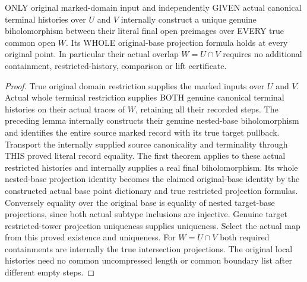 \begin{theorem}
\label{hir:original-independent-local-terminal-overlap-unique-comparison}
\leanok
ONLY original marked-domain input and independently GIVEN actual canonical
terminal histories over $U$ and $V$ internally construct a unique genuine
biholomorphism between their literal final open preimages over EVERY true
common open $W$. Its WHOLE original-base projection formula holds at every
original point. In particular their actual overlap $W=U\cap V$ requires
no additional containment, restricted-history, comparison or lift certificate.
\end{theorem}
\begin{proof}
True original domain restriction supplies the marked inputs over $U$ and
$V$. Actual whole terminal restriction supplies BOTH genuine canonical
terminal histories on their actual traces of $W$, retaining all their
recorded steps. The preceding lemma internally constructs their genuine
nested-base biholomorphism and identifies the entire source marked record
with its true target pullback. Transport the internally supplied source
canonicality and terminality through THIS proved literal record equality.
The first theorem applies to these actual restricted histories and
internally supplies a real final biholomorphism. Its whole nested-base
projection identity becomes the claimed original-base identity by the
constructed actual base point dictionary and true restricted projection
formulas. Conversely equality over the original base is equality of
nested target-base projections, since both actual subtype inclusions are
injective. Genuine target restricted-tower projection uniqueness supplies
uniqueness. Select the actual map from this proved existence and uniqueness.
For $W=U\cap V$ both required containments are internally the true
intersection projections. The original local histories need no common
uncompressed length or common boundary list after different empty steps.
\end{proof}

